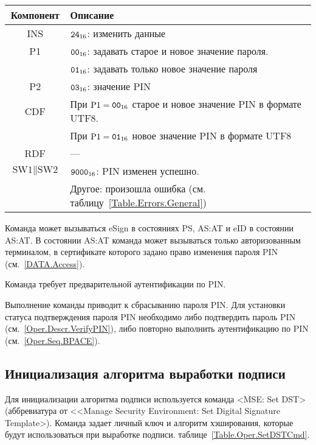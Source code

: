 \begin{table}[hbt]
\caption{}\label{Table.Oper.ChangePINCmd}
\begin{tabular}{|c|p{14cm}|}
\hline
Компонент & 	Описание \\
\hline
\hline
INS & $\texttt{24}_{16}$: изменить данные\\
\hline
P1 & $\texttt{00}_{16}$: задавать старое и новое значение пароля. \\
   & $\texttt{01}_{16}$: задавать только новое значение пароля\\
\hline
P2 & $\texttt{03}_{16}$: значение PIN \\
\hline
CDF & При $\text{P1}=\texttt{00}_{16}$ старое и новое значение PIN в формате UTF8.\\
    & При $\text{P1}=\texttt{01}_{16}$ новое значение PIN в формате UTF8\\
\hline 
RDF & 	 --- \\
\hline
$\text{SW1}\parallel\text{SW2}$ & 
 $\texttt{9000}_{16}$: PIN изменен успешно. \\
  & Другое: произошла ошибка (см. таблицу~\ref{Table.Errors.General})\\
\hline
\end{tabular}
\end{table}

Команда может вызываться  eSign в состояниях 
PS, AS:AT и  eID в состоянии AS:AT. 
В состоянии AS:AT команда может вызываться только авторизованным терминалом, 
в сертификате которого задано право изменения пароля PIN
(см.~\ref{DATA.Access}).

Команда требует предварительной аутентификации по PIN. 

Выполнение команды приводит к сбрасыванию 
 пароля PIN.
Для установки статуса подтверждения пароля PIN 
необходимо либо подтвердить пароль PIN (см.~\ref{Oper.Descr.VerifyPIN}), 
либо повторно выполнить аутентификацию по PIN (см.~\ref{Oper.Seq.BPACE}).


\subsection{Инициализация алгоритма выработки подписи}
\label{Oper.Descr.SetDST}

Для инициализации алгоритма подписи используется команда     
<MSE: Set DST> (аббревиатура от <<Manage Security Environment: Set 
Digital Signature Template>). Команда задает личный ключ и алгоритм
хэширования, которые будут использоваться при выработке подписи.
%
 таблице~\ref{Table.Oper.SetDSTCmd}.

